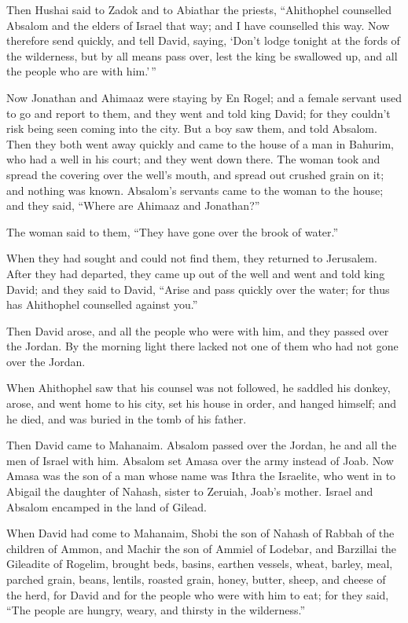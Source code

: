  Then Hushai said to Zadok and to Abiathar the priests,
``Ahithophel counselled Absalom and the elders of Israel that way; and I
have counselled this way.  Now therefore send quickly,
and tell David, saying, `Don't lodge tonight at the fords of the
wilderness, but by all means pass over, lest the king be swallowed up,
and all the people who are with him.'\,''

 Now Jonathan and Ahimaaz were staying by En Rogel; and a
female servant used to go and report to them, and they went and told
king David; for they couldn't risk being seen coming into the city.
 But a boy saw them, and told Absalom. Then they both
went away quickly and came to the house of a man in Bahurim, who had a
well in his court; and they went down there.  The woman
took and spread the covering over the well's mouth, and spread out
crushed grain on it; and nothing was known.  Absalom's
servants came to the woman to the house; and they said, ``Where are
Ahimaaz and Jonathan?''

The woman said to them, ``They have gone over the brook of water.''

When they had sought and could not find them, they returned to
Jerusalem.  After they had departed, they came up out of
the well and went and told king David; and they said to David, ``Arise
and pass quickly over the water; for thus has Ahithophel counselled
against you.''

 Then David arose, and all the people who were with him,
and they passed over the Jordan. By the morning light there lacked not
one of them who had not gone over the Jordan.

 When Ahithophel saw that his counsel was not followed,
he saddled his donkey, arose, and went home to his city, set his house
in order, and hanged himself; and he died, and was buried in the tomb of
his father.

 Then David came to Mahanaim. Absalom passed over the
Jordan, he and all the men of Israel with him.  Absalom
set Amasa over the army instead of Joab. Now Amasa was the son of a man
whose name was Ithra the Israelite, who went in to Abigail the daughter
of Nahash, sister to Zeruiah, Joab's mother.  Israel and
Absalom encamped in the land of Gilead.

 When David had come to Mahanaim, Shobi the son of Nahash
of Rabbah of the children of Ammon, and Machir the son of Ammiel of
Lodebar, and Barzillai the Gileadite of Rogelim,  brought
beds, basins, earthen vessels, wheat, barley, meal, parched grain,
beans, lentils, roasted grain,  honey, butter, sheep, and
cheese of the herd, for David and for the people who were with him to
eat; for they said, ``The people are hungry, weary, and thirsty in the
wilderness.''

